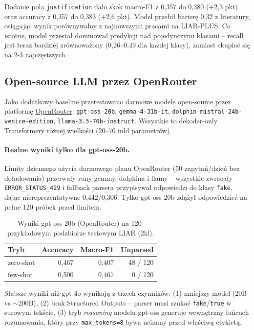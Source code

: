 \documentclass[11pt,a4paper]{article}
\begin{document}
Dodanie pola \texttt{justification} dało skok macro-F1 z 0{,}357 do
0{,}380 (+2{,}3 pkt) oraz accuracy z 0{,}357 do 0{,}383 (+2{,}6 pkt). Model
przebił barierę 0{,}32 z literatury, osiągając wynik porównywalny z
najnowszymi pracami na LIAR-PLUS. Co istotne, model przestał dominować
predykcji nad pojedynczymi klasami -- recall jest teraz bardziej
zrównoważony (0{,}26--0{,}49 dla każdej klasy), zamiast skupiać się na
2-3 najczęstszych.

\subsection{Open-source LLM przez OpenRouter}\label{sec:openrouter}

Jako dodatkowy baseline przetestowano darmowe modele open-source przez
platformę \href{https://openrouter.ai}{OpenRouter}: \texttt{gpt-oss-20b},
\texttt{gemma-4-31b-it}, \texttt{dolphin-mistral-24b-venice-edition},
\texttt{llama-3.3-70b-instruct}. Wszystkie to dekoder-only Transformery
różnej wielkości (20--70 mld parametrów).

\paragraph{Realne wyniki tylko dla gpt-oss-20b.} Limity dziennego użycia
darmowego planu OpenRouter (50 zapytań/dzień bez doładowania) przerwały
runy gemmy, dolphina i llamy -- wszystkie zwracały \texttt{ERROR\_STATUS\_429}
i fallback parsera przypisywał odpowiedzi do klasy \texttt{fake},
dając niereprezentatywne 0{,}442/0{,}306. Tylko gpt-oss-20b zdążył odpowiedzieć
na pełne 120 próbek przed limitem.

\begin{table}[h]
\centering
\caption{Wyniki gpt-oss-20b (OpenRouter) na 120-przykładowym podzbiorze
testowym LIAR (2kl).}
\label{tab:openrouter}
\begin{tabular}{lrrr}
\toprule
Tryb & Accuracy & Macro-F1 & Unparsed \\
\midrule
zero-shot & 0{,}467 & 0{,}407 & 48 / 120 \\
few-shot  & 0{,}500 & 0{,}467 &  0 / 120 \\
\bottomrule
\end{tabular}
\end{table}

Słabsze wyniki niż gpt-4o wynikają z trzech czynników: (1) mniejszy model
(20B vs $\sim$200B), (2) brak Structured Outputs -- parser musi szukać
\texttt{fake}/\texttt{true} w surowym tekście, (3) tryb \emph{reasoning}
modelu gpt-oss generuje wewnętrzny łańcuch rozumowania, który przy
\texttt{max\_tokens=8} bywa ucinany przed właściwą etykietą.
\end{document}
